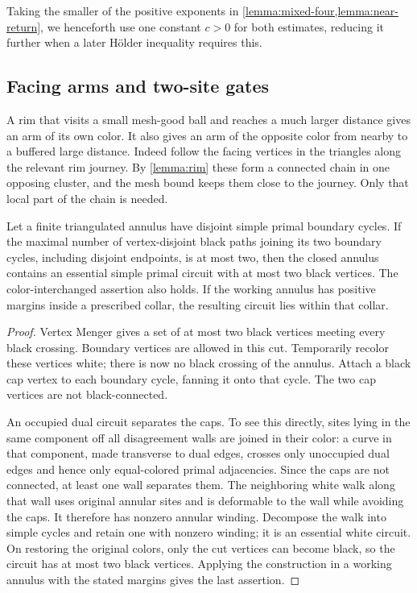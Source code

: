 Taking the smaller of the positive exponents in
\cref{lemma:mixed-four,lemma:near-return}, we henceforth use one constant
$c>0$ for both estimates, reducing it further when a later H\"older
inequality requires this.

\subsection{Facing arms and two-site gates}

A rim that visits a small mesh-good ball and reaches a much larger
distance gives an arm of its own color.  It also gives an arm of the
opposite color from nearby to a buffered large distance.  Indeed follow
the facing vertices in the triangles along the relevant rim journey.
By \cref{lemma:rim} these form a connected chain in one opposing cluster,
and the mesh bound keeps them close to the journey.  Only that local part
of the chain is needed.

\begin{lemma}\label{lemma:two-gates}
Let a finite triangulated annulus have disjoint simple primal boundary
cycles.  If the maximal number of vertex-disjoint black paths joining
its two boundary cycles, including disjoint endpoints, is at most two,
then the closed annulus contains an essential simple primal circuit
with at most two black vertices.  The color-interchanged assertion also
holds.  If the working annulus has positive margins inside a prescribed
collar, the resulting circuit lies within that collar.
\end{lemma}

\begin{proof}
Vertex Menger gives a set of at most two black vertices meeting every
black crossing.  Boundary vertices are allowed in this cut.  Temporarily
recolor these vertices white; there is now no black crossing of the
annulus.  Attach a black cap vertex to each boundary cycle, fanning it
onto that cycle.  The two cap vertices are not black-connected.

An occupied dual circuit separates the caps.  To see this directly,
sites lying in the same component off all disagreement walls are joined
in their color: a curve in that component, made transverse to dual edges,
crosses only unoccupied dual edges and hence only equal-colored primal
adjacencies.  Since the caps are not
connected, at least one wall separates them.  The neighboring white
walk along that wall uses original annular sites and is deformable to
the wall while avoiding the caps.  It therefore has nonzero annular
winding.  Decompose the walk into simple cycles and retain one with
nonzero winding; it is an essential white circuit.  On restoring the
original colors, only the cut vertices can become black, so the circuit
has at most two black vertices.  Applying the construction in a working
annulus with the stated margins gives the last assertion.
\end{proof}
